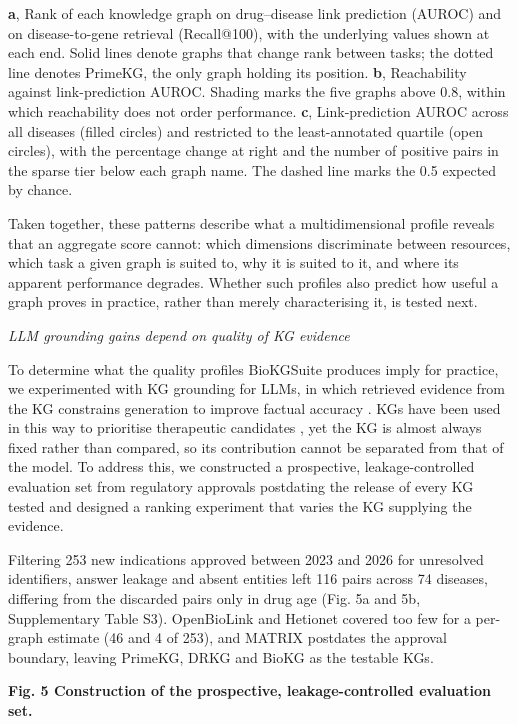 \textbf{a}, Rank of each knowledge graph on drug--disease link prediction (AUROC) and on disease-to-gene retrieval (Recall@100), with the underlying values shown at each end. Solid lines denote graphs that change rank between tasks; the dotted line denotes PrimeKG, the only graph holding its position. \textbf{b}, Reachability against link-prediction AUROC. Shading marks the five graphs above 0.8, within which reachability does not order performance. \textbf{c}, Link-prediction AUROC across all diseases (filled circles) and restricted to the least-annotated quartile (open circles), with the percentage change at right and the number of positive pairs in the sparse tier below each graph name. The dashed line marks the 0.5 expected by chance.

Taken together, these patterns describe what a multidimensional profile reveals that an aggregate score cannot: which dimensions discriminate between resources, which task a given graph is suited to, why it is suited to it, and where its apparent performance degrades. Whether such profiles also predict how useful a graph proves in practice, rather than merely characterising it, is tested next.

\emph{LLM grounding gains depend on quality of KG evidence}

To determine what the quality profiles BioKGSuite produces imply for practice, we experimented with KG grounding for LLMs, in which retrieved evidence from the KG constrains generation to improve factual accuracy \cite{joy2026,matsumoto2024}. KGs have been used in this way to prioritise therapeutic candidates \cite{weidrugklm2026}, yet the KG is almost always fixed rather than compared, so its contribution cannot be separated from that of the model. To address this, we constructed a prospective, leakage-controlled evaluation set from regulatory approvals postdating the release of every KG tested and designed a ranking experiment that varies the KG supplying the evidence.

Filtering 253 new indications approved between 2023 and 2026 for unresolved identifiers, answer leakage and absent entities left 116 pairs across 74 diseases, differing from the discarded pairs only in drug age (Fig. 5a and 5b, Supplementary Table S3). OpenBioLink and Hetionet covered too few for a per-graph estimate (46 and 4 of 253), and MATRIX postdates the approval boundary, leaving PrimeKG, DRKG and BioKG as the testable KGs.

\textbf{Fig. 5 \textbar{} Construction of the prospective, leakage-controlled evaluation set.}

